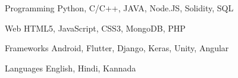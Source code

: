 


\begin{cvskills}


\cvskill
{Programming} %
{Python, C/C++, JAVA, Node.JS, Solidity, SQL} %


\cvskill
{Web} %
{HTML5, JavaScript, CSS3, MongoDB, PHP} %


\cvskill
{Frameworks} %
{Android, Flutter, Django, Keras, Unity, Angular} %


\cvskill
{Languages} %
{English, Hindi, Kannada} %


\end{cvskills}